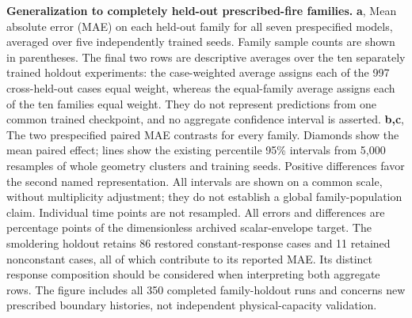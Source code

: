 \textbf{Generalization to completely held-out prescribed-fire families.}
\textbf{a}, Mean absolute error (MAE) on each held-out family for all seven prespecified models, averaged over five independently trained seeds. Family sample counts are shown in parentheses. The final two rows are descriptive averages over the ten separately trained holdout experiments: the case-weighted average assigns each of the 997 cross-held-out cases equal weight, whereas the equal-family average assigns each of the ten families equal weight. They do not represent predictions from one common trained checkpoint, and no aggregate confidence interval is asserted.
\textbf{b,c}, The two prespecified paired MAE contrasts for every family. Diamonds show the mean paired effect; lines show the existing percentile 95\% intervals from 5,000 resamples of whole geometry clusters and training seeds. Positive differences favor the second named representation. All intervals are shown on a common scale, without multiplicity adjustment; they do not establish a global family-population claim. Individual time points are not resampled.
All errors and differences are percentage points of the dimensionless archived scalar-envelope target. The smoldering holdout retains 86 restored constant-response cases and 11 retained nonconstant cases, all of which contribute to its reported MAE. Its distinct response composition should be considered when interpreting both aggregate rows. The figure includes all 350 completed family-holdout runs and concerns new prescribed boundary histories, not independent physical-capacity validation.
